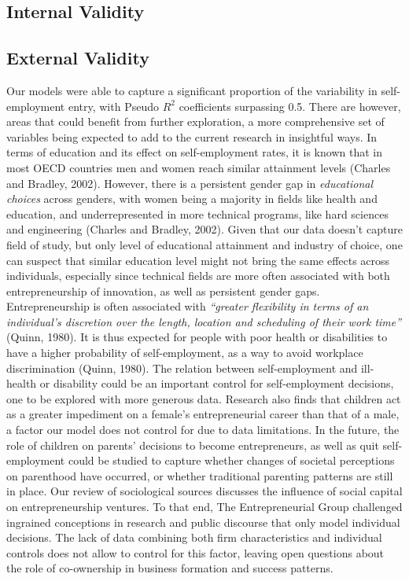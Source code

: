 \subsection{Internal Validity}

\subsection{External Validity}

Our models were able to capture a significant proportion of the variability in self-employment entry, with Pseudo $R^2$ coefficients surpassing 0.5. There are however, areas that could benefit from further exploration, a more comprehensive set of variables being expected to add to the current research in insightful ways. In terms of education and its effect on self-employment rates, it is known that in most OECD countries men and women reach similar attainment levels (Charles and Bradley, 2002). However, there is a persistent gender gap in \textit{educational choices} across genders, with women being a majority in fields like health and education, and underrepresented in more technical programs, like hard sciences and engineering (Charles and Bradley, 2002). Given that our data doesn't capture field of study, but only level of educational attainment and industry of choice, one can suspect that similar education level might not bring the same effects across individuals, especially since technical fields are more often associated with both entrepreneurship of innovation, as well as persistent gender gaps. 
Entrepreneurship is often associated with \textit{“greater flexibility in terms of an individual's discretion over the length, location and scheduling of their work time”} (Quinn, 1980). It is thus expected for people with poor health or disabilities to have a higher probability of self-employment, as a way to avoid workplace discrimination (Quinn, 1980). The relation between self-employment and ill-health or disability could be an important control for self-employment decisions, one to be explored with more generous data.  Research also finds that children act as a greater impediment on a female's entrepreneurial career than that of a male, a factor our model does not control for due to data limitations. In the future, the role of children on parents' decisions to become entrepreneurs, as well as quit self-employment could be studied to capture whether changes of societal perceptions on parenthood have occurred, or whether traditional parenting patterns are still in place.  
Our review of sociological sources discusses the influence of social capital on entrepreneurship ventures. To that end, The Entrepreneurial Group challenged ingrained conceptions in research and public discourse that only model individual decisions. The lack of data combining both firm characteristics and individual controls does not allow to control for this factor, leaving open questions about the role of co-ownership in business formation and success patterns. 















